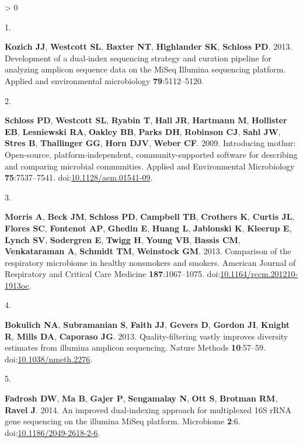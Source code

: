 \documentclass[
]{article}
\newlength{\cslhangindent}
\newlength{\csllabelwidth}
\newenvironment{CSLReferences}[3] %
 {%
  \setlength{\parindent}{0pt}
  \ifodd #1 \everypar{\setlength{\hangindent}{\cslhangindent}}\ignorespaces\fi
  \ifnum #2 > 0
  \setlength{\parskip}{#2\baselineskip}
  \fi
 }%
 {}
\newcommand{\CSLLeftMargin}[1]{\parbox[t]{\csllabelwidth}{#1}}
\newcommand{\CSLRightInline}[1]{\parbox[t]{\linewidth - \csllabelwidth}{#1}}
\begin{document}
\hypertarget{refs}{}
\begin{CSLReferences}{0}{0}
\leavevmode\hypertarget{ref-Kozich2013}{}%
\CSLLeftMargin{1. }
\CSLRightInline{\textbf{Kozich JJ}, \textbf{Westcott SL}, \textbf{Baxter
NT}, \textbf{Highlander SK}, \textbf{Schloss PD}. 2013. {Development of
a dual-index sequencing strategy and curation pipeline for analyzing
amplicon sequence data on the MiSeq Illumina sequencing platform}.
Applied and environmental microbiology \textbf{79}:5112--5120.}

\leavevmode\hypertarget{ref-Schloss2009}{}%
\CSLLeftMargin{2. }
\CSLRightInline{\textbf{Schloss PD}, \textbf{Westcott SL},
\textbf{Ryabin T}, \textbf{Hall JR}, \textbf{Hartmann M},
\textbf{Hollister EB}, \textbf{Lesniewski RA}, \textbf{Oakley BB},
\textbf{Parks DH}, \textbf{Robinson CJ}, \textbf{Sahl JW}, \textbf{Stres
B}, \textbf{Thallinger GG}, \textbf{Horn DJV}, \textbf{Weber CF}. 2009.
Introducing mothur: Open-source, platform-independent,
community-supported software for describing and comparing microbial
communities. Applied and Environmental Microbiology
\textbf{75}:7537--7541.
doi:\href{https://doi.org/10.1128/aem.01541-09}{10.1128/aem.01541-09}.}

\leavevmode\hypertarget{ref-Morris2013}{}%
\CSLLeftMargin{3. }
\CSLRightInline{\textbf{Morris A}, \textbf{Beck JM}, \textbf{Schloss
PD}, \textbf{Campbell TB}, \textbf{Crothers K}, \textbf{Curtis JL},
\textbf{Flores SC}, \textbf{Fontenot AP}, \textbf{Ghedin E},
\textbf{Huang L}, \textbf{Jablonski K}, \textbf{Kleerup E},
\textbf{Lynch SV}, \textbf{Sodergren E}, \textbf{Twigg H}, \textbf{Young
VB}, \textbf{Bassis CM}, \textbf{Venkataraman A}, \textbf{Schmidt TM},
\textbf{Weinstock GM}. 2013. Comparison of the respiratory microbiome in
healthy nonsmokers and smokers. American Journal of Respiratory and
Critical Care Medicine \textbf{187}:1067--1075.
doi:\href{https://doi.org/10.1164/rccm.201210-1913oc}{10.1164/rccm.201210-1913oc}.}

\leavevmode\hypertarget{ref-Bokulich2013}{}%
\CSLLeftMargin{4. }
\CSLRightInline{\textbf{Bokulich NA}, \textbf{Subramanian S},
\textbf{Faith JJ}, \textbf{Gevers D}, \textbf{Gordon JI}, \textbf{Knight
R}, \textbf{Mills DA}, \textbf{Caporaso JG}. 2013. Quality-filtering
vastly improves diversity estimates from illumina amplicon sequencing.
Nature Methods \textbf{10}:57--59.
doi:\href{https://doi.org/10.1038/nmeth.2276}{10.1038/nmeth.2276}.}

\leavevmode\hypertarget{ref-Fadrosh2014}{}%
\CSLLeftMargin{5. }
\CSLRightInline{\textbf{Fadrosh DW}, \textbf{Ma B}, \textbf{Gajer P},
\textbf{Sengamalay N}, \textbf{Ott S}, \textbf{Brotman RM},
\textbf{Ravel J}. 2014. An improved dual-indexing approach for
multiplexed 16S {rRNA} gene sequencing on the illumina {MiSeq} platform.
Microbiome \textbf{2}:6.
doi:\href{https://doi.org/10.1186/2049-2618-2-6}{10.1186/2049-2618-2-6}.}


\end{CSLReferences}
\end{document}
